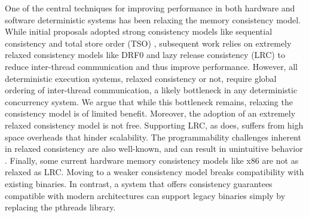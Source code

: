 One of the central techniques for improving performance in both hardware and software deterministic systems has been relaxing the memory consistency model. While initial proposals adopted strong consistency models like sequential consistency \cite{devietti_dmp:_2009} and total store order (TSO) \cite{bergan_coredet:_2010}, subsequent work relies on extremely relaxed consistency models like DRF0 \cite{devietti_rcdc:_2011} and lazy release consistency (LRC) \cite{kai_lu_efficient_2014} to reduce inter-thread communication and thus improve performance.
However, all deterministic execution systems, relaxed consistency or not, require global ordering of inter-thread communication, a likely bottleneck in any deterministic concurrency system. 
We argue that while this bottleneck remains, relaxing the consistency model is of limited benefit. 
Moreover, the adoption of an extremely relaxed consistency model is not free. Supporting LRC, as \cite{kai_lu_efficient_2014} does, suffers from high space overheads that hinder scalability. The programmability challenges inherent in relaxed consistency are also well-known, and can result in unintuitive behavior \cite{adve_data_2010,batty_mathematizing_2011}. Finally, some current hardware memory consistency models like x86 are not as relaxed as LRC. Moving to a weaker consistency model breaks compatibility with existing binaries. In contrast, a system that offers consistency guarantees compatible with modern architectures can support legacy binaries simply by replacing the pthreads library.


